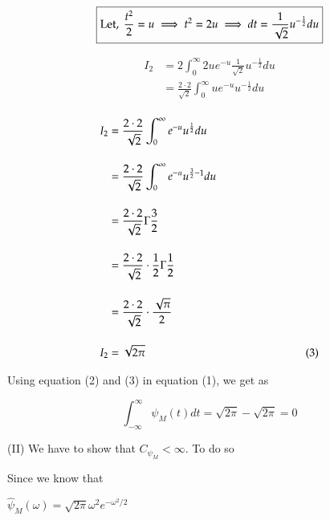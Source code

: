 \documentclass[12pt, a4paper]{article} %
\begin{document}
\[\boxed{\mbox{Let}, \ \frac{t^2}{2} = u\\
\implies t^2 = 2u\\
\implies dt = \frac{1}{\sqrt{2}}u^{-\frac{1}{2}}du}\]


\begin{equation*}
    \begin{split}
        I_2 & = 2\int_{0}^{\infty}2u e^{-u}\frac{1}{\sqrt{2}}u^{-\frac{1}{2}}du\\[4mm]
        & = \frac{2\cdot 2}{\sqrt{2}}\int_{0}^{\infty}u e^{-u}u^{-\frac{1}{2}}du\\[4mm]
    \end{split}
\end{equation*}

\begin{equation*}
    \begin{split}
        I_2 & = \frac{2\cdot 2}{\sqrt{2}}\int_{0}^{\infty}e^{-u}u^{\frac{1}{2}}du\\[4mm]
        & = \frac{2\cdot 2}{\sqrt{2}}\int_{0}^{\infty}e^{-u}u^{\frac{3}{2}-1}du\\[4mm]
        & = \frac{2\cdot 2}{\sqrt{2}}\Gamma\frac{3}{2}\\[4mm]
        & = \frac{2\cdot 2}{\sqrt{2}}\cdot \frac{1}{2}\Gamma\frac{1}{2}\\[4mm]
        & = \frac{2\cdot 2}{\sqrt{2}}\cdot \frac{\sqrt{\pi}}{2}\\[4mm]
        I_2 &  = \sqrt{2\pi}\hspace*{5cm}(3)
    \end{split}
\end{equation*}

\begin{center}
    Using equation (2) and (3) in equation (1), we get as
\end{center}
\BgThispage
\[\boxed{\int_{-\infty}^{\infty}\psi_M(t)dt = \sqrt{2\pi} - \sqrt{2\pi} = 0}\]

\vspace*{1cm}

(II) We have to show that $C_{\psi_M} < \infty$. To do so

Since we know that

\begin{center}
    $\displaystyle {\hat{\psi}_M(\omega) = \sqrt{2\pi} \omega^2 e^{-\omega^2/2}}$
\end{center}
\end{document}

